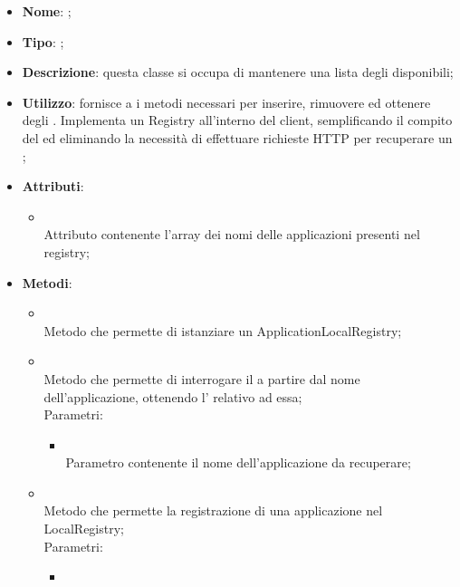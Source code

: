 \begin{itemize}
	\item \textbf{Nome}: ;
	\item \textbf{Tipo}: ;
	\item \textbf{Descrizione}: questa classe si occupa di mantenere una lista degli  disponibili;
	\item \textbf{Utilizzo}: fornisce a  i metodi necessari per inserire, rimuovere ed ottenere degli . Implementa un Registry all'interno del client, semplificando il compito del  ed eliminando la necessità di effettuare richieste HTTP per recuperare un ;
	\item \textbf{Attributi}:
	\begin{itemize}
		\item[]  \\
		Attributo contenente l'array dei nomi delle applicazioni presenti nel registry;
	\end{itemize}
	\item \textbf{Metodi}:
	\begin{itemize}
		\item[]  \\
		Metodo che permette di istanziare un ApplicationLocalRegistry;\\
		\item[]  \\
		Metodo che permette di interrogare il  a partire dal nome dell'applicazione, ottenendo l'  relativo ad essa;\\
		Parametri:
		\begin{itemize}
			\item {} \\
			Parametro contenente il nome dell'applicazione da recuperare;
		\end{itemize}
		\item[]  \\
		Metodo che permette la registrazione di una applicazione nel LocalRegistry;\\
		Parametri:
		\begin{itemize}
			\item {} \\

\end{itemize}
\end{itemize}
\end{itemize}
